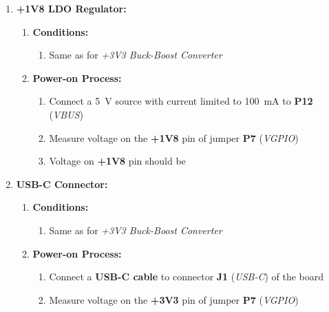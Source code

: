 \documentclass[Report.tex]{subfiles}
\begin{document}
\begin{enumerate}
\begin{enumerate}
\begin{enumerate}
\item Jumper \textbf{P6} (\textit{VLED}) is disconnected
\end{enumerate}
\item \textbf{Power-on Process:}
\begin{enumerate}
\item Connect a \SI{5}{\volt} source with current limited to \SI{100}{\milli\ampere} to \textbf{P12} (\textit{VBUS})
\item Measure voltage on the \textbf{+3V3} pin of jumper \textbf{P7} (\textit{VGPIO})
\item Voltage on \textbf{+3V3} pin should be 
\end{enumerate}
\end{enumerate}
\item \textbf{+1V8 LDO Regulator:}
\begin{enumerate}
\item \textbf{Conditions:}
\begin{enumerate}
\item Same as for \textit{+3V3 Buck-Boost Converter}
\end{enumerate}
\item \textbf{Power-on Process:}
\begin{enumerate}
\item Connect a \SI{5}{\volt} source with current limited to \SI{100}{\milli\ampere} to \textbf{P12} (\textit{VBUS})
\item Measure voltage on the \textbf{+1V8} pin of jumper \textbf{P7} (\textit{VGPIO})
\item Voltage on \textbf{+1V8} pin should be 
\end{enumerate}
\end{enumerate}
\item \textbf{USB-C Connector:}
\begin{enumerate}
\item \textbf{Conditions:}
\begin{enumerate}
\item Same as for \textit{+3V3 Buck-Boost Converter}
\end{enumerate}
\item \textbf{Power-on Process:}
\begin{enumerate}
\item Connect a \textbf{USB-C cable} to connector \textbf{J1} (\textit{USB-C}) of the board
\item Measure voltage on the \textbf{+3V3} pin of jumper \textbf{P7} (\textit{VGPIO})

\end{enumerate}
\end{enumerate}
\end{enumerate}
\end{document}
